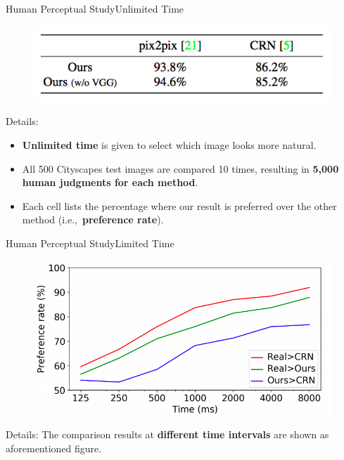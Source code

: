 \documentclass{beamer}
\begin{document}
\begin{frame}{Human Perceptual Study}{Unlimited Time}
\begin{figure}
	\centering
	\includegraphics[height=0.35\textheight]{images/unlimite_time}
\end{figure}
%
%
\begin{beamerboxesrounded}[upper=uppercol,lower=lowercol,shadow=false]{Details: }
	\begin{itemize}
	\item
	\textbf{ Unlimited time} is given to select which image looks more natural.
	\item
	All 500 Cityscapes test images are compared 10 times, resulting in \textbf{ 5,000 human judgments for each method}.
	\item
	Each cell lists the percentage where our result is preferred over the other method (i.e.,\ \textbf{preference rate}).
	\end{itemize}

\end{beamerboxesrounded}
\end{frame}

\begin{frame}{Human Perceptual Study}{Limited Time}
\begin{figure}
	\centering
	\includegraphics[height=0.45\textheight]{images/limite_time}
\end{figure}
%
%
\begin{beamerboxesrounded}[upper=uppercol,lower=lowercol,shadow=false]{Details: }
The comparison results at \textbf{different time intervals} are shown as aforementioned figure.
\end{beamerboxesrounded}
\end{frame}
\end{document}
